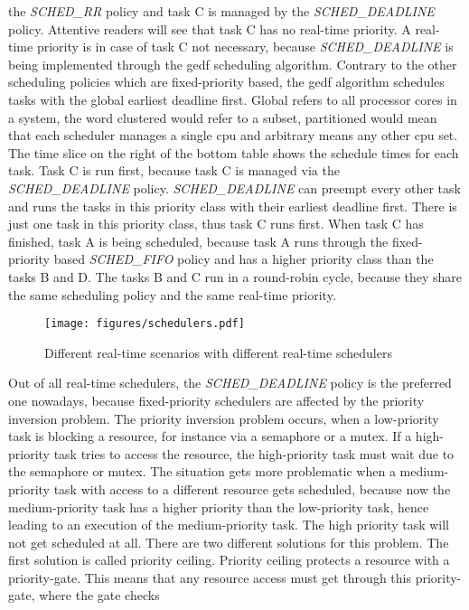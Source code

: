\documentclass[titlepage]{report}
\begin{document}
the \emph{SCHED\_RR} policy and task C is managed by the \emph{SCHED\_DEADLINE} policy. Attentive readers will see that task C has no real-time priority. A real-time priority is in case of task C not necessary, because
\emph{SCHED\_DEADLINE} is being implemented through the \gls{gedf} scheduling algorithm. Contrary to the other scheduling policies which are fixed-priority based, the \gls{gedf} algorithm schedules tasks with the global earliest
deadline first. Global refers to all processor cores in a system, the word clustered would refer to a subset, partitioned would mean that each scheduler manages a single \gls{cpu} and arbitrary means any other \gls{cpu} set\cite{LWNDeadline}.
The time slice on the right of the bottom table shows the schedule times for each task. Task C is run first, because task C is managed via the \emph{SCHED\_DEADLINE} policy. \emph{SCHED\_DEADLINE} can preempt every other task
and runs the tasks in this priority class with their earliest deadline first. There is just one task in this priority class, thus task C runs first. When task C has finished, task A is being scheduled, because task A
runs through the fixed-priority based \emph{SCHED\_FIFO} policy and has a higher priority class than the tasks B and D. The tasks B and C run in a round-robin cycle, because they share the same scheduling policy and the same
real-time priority.
\begin{figure}[H]
  \centering
  \texttt{[image: figures/schedulers.pdf]}
  \caption{Different real-time scenarios with different real-time schedulers}\label{fig:schedulers}
\end{figure}
Out of all real-time schedulers, the \emph{SCHED\_DEADLINE} policy is the preferred one nowadays, because fixed-priority schedulers are affected by the priority inversion problem\cite{tanenbaum2009modern}.
The priority inversion problem occurs, when a low-priority task is blocking a resource, for instance via a semaphore or a mutex. If a high-priority task tries to access the resource, the high-priority task
must wait due to the semaphore or mutex. The situation gets more problematic when a medium-priority task with access to a different resource gets scheduled, because now the medium-priority task has a higher
priority than the low-priority task, hence leading to an execution of the medium-priority task. The high priority task will not get scheduled at all. There are two different solutions for this problem.
The first solution is called priority ceiling. Priority ceiling protects a resource with a priority-gate. This means that any resource access must get through this priority-gate, where the gate checks
\end{document}
